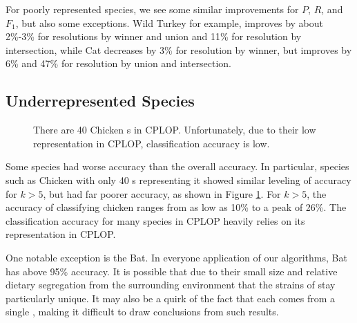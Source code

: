 For poorly represented species, we see some similar improvements for $P$, $R$, and $F_1$, but also some exceptions. Wild Turkey for example, improves by about 2\%-3\% for resolutions by winner and union and 11\% for resolution by intersection, while Cat decreases by 3\% for resolution by winner, but improves by 6\% and 47\% for resolution by union and intersection.

\subsection{Underrepresented Species}
\begin{figure}[t]
\centering
{}
\caption{There are 40 Chicken \isol{}s in CPLOP. Unfortunately, due to their low representation in CPLOP, classification accuracy is low.}
\label{fig:k_chicken}
\end{figure}
Some species had worse accuracy than the overall accuracy. In particular, species such as Chicken with only 40 \isol{}s representing it showed similar leveling of accuracy for $k>5$, but had far poorer accuracy, as shown in Figure \ref{fig:k_chicken}. For $k>5$, the accuracy of classifying chicken ranges from as low as 10\% to a peak of 26\%. The classification accuracy for many species in CPLOP heavily relies on its representation in CPLOP.

One notable exception is the Bat. In everyone application of our \kNN{} algorithms, Bat has above 95\% accuracy. It is possible that due to their small size and relative dietary segregation from the surrounding environment that the strains of \ecoli{} stay particularly unique. It may also be a quirk of the fact that each \isol{} comes from a single \host{}, making it difficult to draw conclusions from such results.
